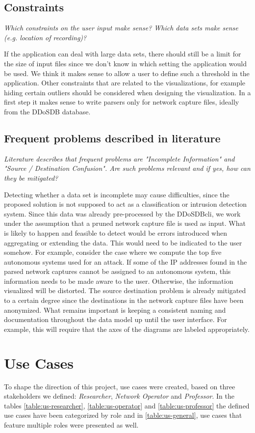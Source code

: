     \subsection{Constraints} 
\textit{Which constraints on the user input make sense? Which data sets make sense (e.g. location of recording)?
}

If the application can deal with large data sets, there should still be a limit for the size of input files since we don't know in which setting the application would be used. We think it makes sense to allow a user to define such a threshold in the application. Other constraints that are related to the visualizations, for example hiding certain outliers should be considered when designing the visualization.
In a first step it makes sense to write parsers only for network capture files, ideally from the DDoSDB database.
    
    \subsection{Frequent problems described in literature} 
    \textit{Literature describes that frequent problems are "Incomplete Information" and "Source / Destination Confusion". Are such problems relevant and if yes, how can they be mitigated?}
    
    Detecting whether a data set is incomplete may cause difficulties, since the proposed solution is not supposed to act as a classification or intrusion detection system. Since this data was already pre-processed by the DDoSDB\-cli, we  work under the assumption that a pruned network capture file is used as input. 
    What is likely to happen and feasible to detect would be errors introduced when aggregating or extending the data. This would need to be indicated to the user somehow. For example, consider the case where we compute the top five autonomous systems used for an attack. If some of the IP addresses found in the parsed network captures cannot be assigned to an autonomous system, this information needs to be made aware to the user. Otherwise, the information visualized will be distorted.
    The source destination problem is already mitigated to a certain degree since the destinations in the network capture files have been anonymized. What remains important is keeping a consistent naming and documentation throughout the data model up until the user interface. For example, this will require that the axes of the diagrams are labeled appropriately.
    
\section{Use Cases}
\label{sec:usecases}
To shape the direction of this project, use cases were created, based on three stakeholders we defined: \emph{Researcher}, \emph{Network Operator} and \emph{Professor}. In the tables \ref{table:us-researcher}, \ref{table:us-operator} and \ref{table:us-professor} the defined use cases have been categorized by role and in \ref{table:us-general}, use cases that feature multiple roles were presented as well.

